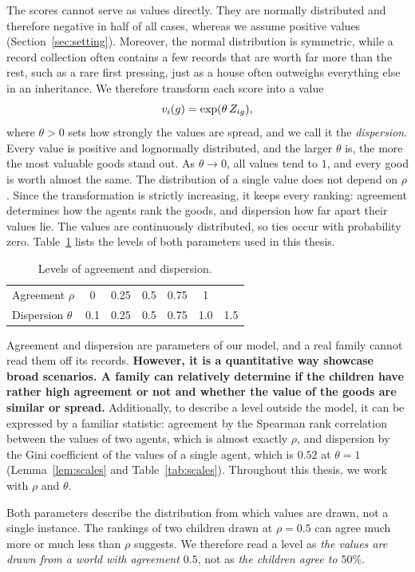 The scores cannot serve as values directly. They are normally distributed and therefore negative
in half of all cases, whereas we assume positive values (Section~\ref{sec:setting}). Moreover, the normal
distribution is symmetric, while a record collection often contains a few records that are worth
far more than the rest, such as a rare first pressing, just as a house often outweighs everything
else in an inheritance. We therefore transform each score into a value
\[
  v_i(g)=\exp(\theta\,Z_{ig}),
\]
where $\theta>0$ sets how strongly the values are spread, and we call it the \textit{dispersion}.
Every value is positive and lognormally distributed, and the larger $\theta$ is, the more the most
valuable goods stand out. As $\theta\to0$, all values tend to $1$, and every good is worth almost
the same. The distribution of a single value does not depend on $\rho$. Since the transformation is
strictly increasing, it keeps every ranking: agreement determines how the agents rank the goods,
and dispersion how far apart their values lie. The values are continuously distributed, so ties
occur with probability zero. Table~\ref{tab:axes} lists the levels of both parameters used in
this thesis.

\begin{table}[ht]
  \centering
  \caption{Levels of agreement and dispersion.}\label{tab:axes}
  \begin{tabular}{lcccccc}
    \toprule
    Agreement $\rho$ & 0 & 0.25 & 0.5 & 0.75 & 1 & \\
    Dispersion $\theta$ & 0.1 & 0.25 & 0.5 & 0.75 & 1.0 & 1.5 \\
    \bottomrule
  \end{tabular}
\end{table}

Agreement and dispersion are parameters of our model, and a real family cannot read them off its
records. \textbf{However, it is a quantitative way showcase broad scenarios. A family can relatively determine if the children have rather high agreement or not and whether the value of the goods are similar or spread.} Additionally, to describe a level outside the model, it can be expressed by a familiar statistic:
agreement by the Spearman rank correlation between the values of two agents, which is almost
exactly $\rho$, and dispersion by the Gini coefficient of the values of a single agent, which is
$0.52$ at $\theta=1$ (Lemma~\ref{lem:scales} and Table~\ref{tab:scales}). Throughout this thesis,
we work with $\rho$ and $\theta$.

Both parameters describe the distribution from which values are drawn, not a single instance. The
rankings of two children drawn at $\rho=0.5$ can agree much more or much less than $\rho$ suggests.
We therefore read a level as \textit{the values are drawn from a world with agreement $0.5$}, not
as \textit{the children agree to $50\%$}.

